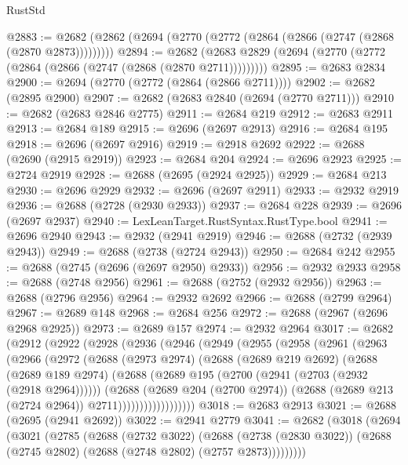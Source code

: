 \begin{lexlean}{RustStd}
\begin{coremodule}
@2883 := @2682 (@2862 (@2694 (@2770 (@2772 (@2864 (@2866 (@2747 (@2868 (@2870 @2873)))))))))
@2894 := @2682 (@2683 @2829 (@2694 (@2770 (@2772 (@2864 (@2866 (@2747 (@2868 (@2870 @2711)))))))))
@2895 := @2683 @2834
@2900 := @2694 (@2770 (@2772 (@2864 (@2866 @2711))))
@2902 := @2682 (@2895 @2900)
@2907 := @2682 (@2683 @2840 (@2694 (@2770 @2711)))
@2910 := @2682 (@2683 @2846 @2775)
@2911 := @2684 @219
@2912 := @2683 @2911
@2913 := @2684 @189
@2915 := @2696 (@2697 @2913)
@2916 := @2684 @195
@2918 := @2696 (@2697 @2916)
@2919 := @2918 @2692
@2922 := @2688 (@2690 (@2915 @2919))
@2923 := @2684 @204
@2924 := @2696 @2923
@2925 := @2724 @2919
@2928 := @2688 (@2695 (@2924 @2925))
@2929 := @2684 @213
@2930 := @2696 @2929
@2932 := @2696 (@2697 @2911)
@2933 := @2932 @2919
@2936 := @2688 (@2728 (@2930 @2933))
@2937 := @2684 @228
@2939 := @2696 (@2697 @2937)
@2940 := LexLeanTarget.RustSyntax.RustType.bool
@2941 := @2696 @2940
@2943 := @2932 (@2941 @2919)
@2946 := @2688 (@2732 (@2939 @2943))
@2949 := @2688 (@2738 (@2724 @2943))
@2950 := @2684 @242
@2955 := @2688 (@2745 (@2696 (@2697 @2950) @2933))
@2956 := @2932 @2933
@2958 := @2688 (@2748 @2956)
@2961 := @2688 (@2752 (@2932 @2956))
@2963 := @2688 (@2796 @2956)
@2964 := @2932 @2692
@2966 := @2688 (@2799 @2964)
@2967 := @2689 @148
@2968 := @2684 @256
@2972 := @2688 (@2967 (@2696 @2968 @2925))
@2973 := @2689 @157
@2974 := @2932 @2964
@3017 := @2682
    (@2912
      (@2922
        (@2928
          (@2936
            (@2946
              (@2949
                (@2955
                  (@2958
                    (@2961
                      (@2963
                        (@2966
                          (@2972
                            (@2688
                              (@2973 @2974)
                              (@2688
                                (@2689 @219 @2692)
                                (@2688
                                  (@2689 @189 @2974)
                                  (@2688
                                    (@2689 @195 (@2700 (@2941 (@2703 (@2932 (@2918 @2964))))))
                                    (@2688
                                      (@2689 @204 (@2700 @2974))
                                      (@2688 (@2689 @213 (@2724 @2964)) @2711))))))))))))))))))
@3018 := @2683 @2913
@3021 := @2688 (@2695 (@2941 @2692))
@3022 := @2941 @2779
@3041 := @2682
    (@3018
      (@2694
        (@3021
          (@2785
            (@2688
              (@2732 @3022)
              (@2688
                (@2738 (@2830 @3022))
                (@2688 (@2745 @2802) (@2688 (@2748 @2802) (@2757 @2873)))))))))

\end{coremodule}
\end{lexlean}
